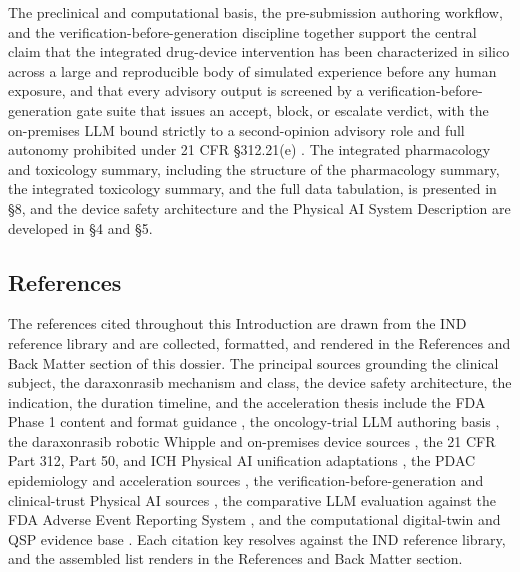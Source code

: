The preclinical and computational basis, the pre-submission authoring workflow, and
the verification-before-generation discipline together support the central claim that
the integrated drug-device intervention has been characterized in silico across a
large and reproducible body of simulated experience before any human exposure, and
that every advisory output is screened by a verification-before-generation gate suite
that issues an accept, block, or escalate verdict, with the on-premises LLM bound
strictly to a second-opinion advisory role and full autonomy prohibited under 21 CFR
\S 312.21(e) \cite{clintrustpai, congress9510}. The integrated pharmacology and
toxicology summary, including the structure of the pharmacology summary, the
integrated toxicology summary, and the full data tabulation, is presented in \S 8,
and the device safety architecture and the Physical AI System Description are
developed in \S 4 and \S 5.

\subsection{References}

The references cited throughout this Introduction are drawn from the IND reference
library and are collected, formatted, and rendered in the References and Back Matter
section of this dossier. The principal sources grounding the clinical subject, the
daraxonrasib mechanism and class, the device safety architecture, the indication,
the duration timeline, and the acceleration thesis include the FDA Phase 1 content
and format guidance \cite{phase1guidance}, the oncology-trial LLM authoring basis
\cite{oncotrialllm}, the daraxonrasib robotic Whipple and on-premises device sources
\cite{daraxwhipple, onpremwhippl}, the 21 CFR Part 312, Part 50, and ICH Physical AI
unification adaptations \cite{cfr312paiuni, cfr050paiuni, ichpaistduni}, the PDAC
epidemiology and acceleration sources \cite{pdac060s2030, paipredict4x,
natlpaiplatf}, the verification-before-generation and clinical-trust Physical AI
sources \cite{congress9510, clintrustpai, paiautospons, paisitedocpk}, the
comparative LLM evaluation against the FDA Adverse Event Reporting System
\cite{llmcomp16fda}, and the computational digital-twin and QSP evidence base
\cite{fdadigtwinpc, qspmetpancre, chatgpt100kp, pdacdigtwinp}. Each citation key
resolves against the IND reference library, and the assembled list renders in the
References and Back Matter section.
